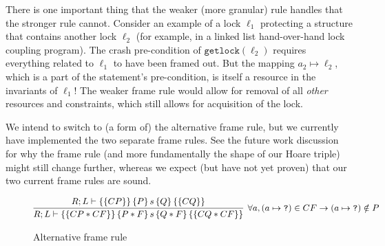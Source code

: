 There is one important thing that the weaker (more granular) rule handles that
the stronger rule cannot.
Consider an example of a lock $\ell_1$ protecting a
structure that contains another lock $\ell_2$ (for example, in a linked list
hand-over-hand lock coupling program).
The crash pre-condition of
$\texttt{getlock}(\ell_2)$ requires everything related to $\ell_1$ to have been
framed out.
But the mapping $a_2\mapsto\ell_2$, which is a part of the
statement's pre-condition, is itself a resource in the invariants of $\ell_1$!
The weaker frame rule would allow for removal of all \textit{other} resources
and constraints, which still allows for acquisition of the lock.

We intend to switch to (a form of) the alternative frame rule, but we currently
have implemented the two separate frame rules.
See the future work discussion
for why the frame rule (and more fundamentally the shape of our Hoare triple)
might still change further, whereas we expect (but have not yet proven) that
our two current frame rules are sound.

\begin{figure*}
\begin{gather*}
    \infer[\forall a, (a \mapsto\texttt{?}) \in CF \imp
    (a\mapsto\texttt{?}) \notin P]
	{\hoarestmt{R}{L}{CP * CF}{P * F}{s}{Q * F}{CQ * CF}}
	{\hoarestmt{R}{L}{CP}{P}{s}{Q}{CQ}}
\end{gather*}
\caption{Alternative frame rule}
\label{fig:altframe}
\end{figure*}

%

